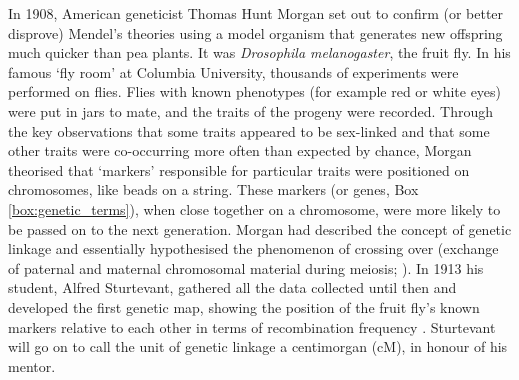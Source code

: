 In 1908, American geneticist Thomas Hunt Morgan set out to confirm (or better disprove) Mendel’s theories using a model organism that generates new offspring much quicker than pea plants. 
It was \textit{Drosophila melanogaster}, the fruit fly. 
In his famous `fly room' at Columbia University, thousands of experiments were performed on flies. 
Flies with known phenotypes (for example red or white eyes) were put in jars to mate, and the traits of the progeny were recorded. 
Through the key observations that some traits appeared to be sex-linked and that some other traits were co-occurring more often than expected by chance, Morgan theorised that `markers' responsible for particular traits were positioned on chromosomes, like beads on a string. 
These markers (or genes, Box \ref{box:genetic_terms}), when close together on a chromosome, were more likely to be passed on to the next generation. 
Morgan had described the concept of genetic linkage and essentially hypothesised the phenomenon of crossing over (exchange of paternal and maternal chromosomal material during meiosis; \cite{morgan1911random}). 
In 1913 his student, Alfred Sturtevant, gathered all the data collected until then and developed the first genetic map, showing the position of the fruit fly’s known markers relative to each other in terms of recombination frequency \cite{sturtevant1913linear}. 
Sturtevant will go on to call the unit of genetic linkage a centimorgan (cM), in honour of his mentor.\\



